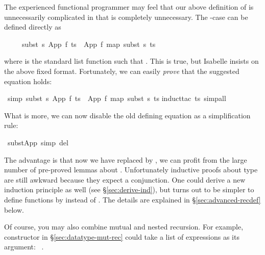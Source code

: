 \begin{isabellebody}
\begin{isamarkuptext}
The experienced functional programmer may feel that our above definition of
 is unnecessarily complicated in that  is
completely unnecessary. The -case can be defined directly as
\begin{isabelle}%
\ \ \ \ \ subst\ s\ {\isacharparenleft}App\ f\ ts{\isacharparenright}\ {\isacharequal}\ App\ f\ {\isacharparenleft}map\ {\isacharparenleft}subst\ s{\isacharparenright}\ ts{\isacharparenright}%
\end{isabelle}
where  is the standard list function such that
. This is true, but Isabelle
insists on the above fixed format. Fortunately, we can easily \emph{prove}
that the suggested equation holds:%
\end{isamarkuptext}%
\ {\isacharbrackleft}simp{\isacharbrackright}{\isacharcolon}\ {\isachardoublequote}subst\ s\ {\isacharparenleft}App\ f\ ts{\isacharparenright}\ {\isacharequal}\ App\ f\ {\isacharparenleft}map\ {\isacharparenleft}subst\ s{\isacharparenright}\ ts{\isacharparenright}{\isachardoublequote}\isanewline
{}induct{\isacharunderscore}tac\ ts{\isacharcomma}\ simp{\isacharunderscore}all{\isacharparenright}%
\begin{isamarkuptext}%
\noindent
What is more, we can now disable the old defining equation as a
simplification rule:%
\end{isamarkuptext}%
\ subst{\isacharunderscore}App\ {\isacharbrackleft}simp\ del{\isacharbrackright}%
\begin{isamarkuptext}%
\noindent
The advantage is that now we have replaced  by
, we can profit from the large number of pre-proved lemmas
about .  Unfortunately inductive proofs about type
 are still awkward because they expect a conjunction. One
could derive a new induction principle as well (see
\S\ref{sec:derive-ind}), but turns out to be simpler to define
functions by  instead of .
The details are explained in \S\ref{sec:advanced-recdef} below.

Of course, you may also combine mutual and nested recursion. For example,
constructor  in \S\ref{sec:datatype-mut-rec} could take a list of
expressions as its argument: ~.%
\end{isamarkuptext}%
\end{isabellebody}%
